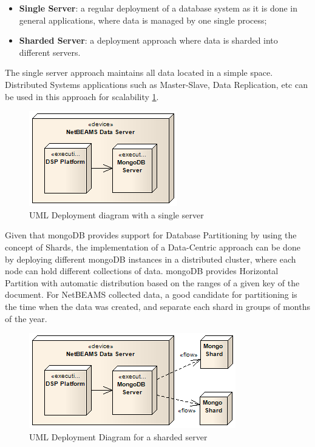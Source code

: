 \begin{itemize}
  \item \textbf{Single Server}: a regular deployment of a database system as it
  is done in general applications, where data is managed by one single process;
  \item \textbf{Sharded Server}: a deployment approach where data is sharded
  into different servers.
\end{itemize} 

The single server approach maintains all data located in a simple space.
Distributed Systems applications such as Master-Slave, Data Replication, etc
can be used in this approach for scalability
\ref{fig:DSP-Data-Persistence-Deployment-Single}. 

\begin{figure}[!h]
  \centering
  \includegraphics[scale=0.7]{../diagrams/DSP-Data-Persistence-Deployment-Single}
  \caption{UML Deployment diagram with a single server}
  \label{fig:DSP-Data-Persistence-Deployment-Single}
\end{figure}

Given that mongoDB provides support for Database Partitioning by using
the concept of Shards, the implementation of a Data-Centric approach can be done
by deploying different mongoDB instances in a distributed cluster, where each
node can hold different collections of data. mongoDB provides Horizontal
Partition with automatic distribution based on the ranges of a given key of
the document. For NetBEAMS collected data, a good candidate for partitioning is
the time when the data was created, and separate each shard in groups of months
of the year.

\begin{figure}[!h]
  \centering
  \includegraphics[scale=0.7]{../diagrams/DSP-Data-Persistence-Deployment-Sharded}
  \caption{UML Deployment Diagram for a sharded server}
  \label{fig:DSP-Data-Persistence-Deployment-Sharded}
\end{figure}

